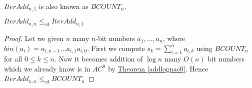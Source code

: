 \begin{remark}
	$IterAdd_{n,1}$ is also known as $BCOUNT_n$.
\end{remark}
\begin{theorem}\label{addnnbcrel}
	$IterAdd_{n,n}\leq_{cd} IterAdd_{n,1}$
\end{theorem}

\begin{proof}
Let we given $n$ many $n$-bit numbers $a_1,\dots,a_n$, where $bin(a_i)=a_{i,n-1}\dots a_{i,1}a_{i,0}$. First we compute $s_{k}=\sum\limits_{i=1}^n a_{i,k}$ using $BCOUNT_n$ for all $0\leq k\leq n$. Now it becomes addition of $\log n$ many $O(n)$ bit numbers which we already know is in $AC^0$ by \hyperref[addlognac0]{Theorem \ref{addlognac0}}. Hence $IterAdd_{n,n}\leq_{cd} BCOUNT_n$
\end{proof}


